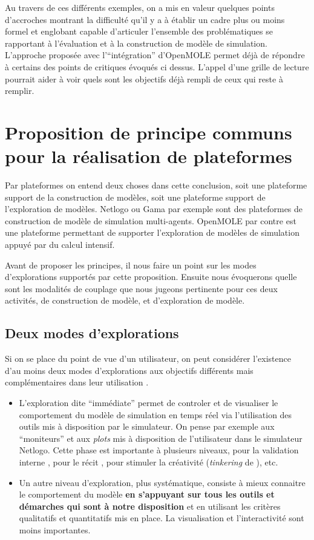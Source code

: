 Au travers de ces différents exemples, on a mis en valeur quelques points d'accroches montrant la difficulté qu'il y a à établir un cadre plus ou moins formel et englobant capable d'articuler l'ensemble des problématiques se rapportant à l'évaluation et à la construction de modèle de simulation. L'approche proposée avec l'\enquote{intégration}  d'OpenMOLE permet déjà de répondre à certains des points de critiques évoqués ci dessus. L'appel d'une grille de lecture pourrait aider à voir quels sont les objectifs déjà rempli de ceux qui reste à remplir.

\section{Proposition de principe communs pour la réalisation de plateformes}

Par plateformes on entend deux choses dans cette conclusion, soit une plateforme support de la construction de modèles, soit une plateforme support de l'exploration de modèles. Netlogo ou Gama par exemple sont des plateformes de construction de modèle de simulation multi-agents. OpenMOLE par contre est une plateforme permettant de supporter l'exploration de modèles de simulation appuyé par du calcul intensif.

Avant de proposer les principes, il nous faire un point sur les modes d'explorations supportés par cette proposition. Ensuite nous évoquerons quelle sont les modalités de couplage que nous jugeons pertinente pour ces deux activités, de construction de modèle, et d'exploration de modèle.

\subsection{Deux modes d'explorations}

Si on se place du point de vue d'un utilisateur, on peut considérer l'existence d'au moins deux modes d'explorations aux objectifs différents mais complémentaires dans leur utilisation \autocite[36]{Amblard2003}.

\begin{itemize}
 \item L'exploration dite \enquote{immédiate} permet de controler et de visualiser le comportement du modèle de simulation en temps réel via l'utilisation des outils mis à disposition par le simulateur. On pense par exemple aux \enquote{moniteurs} et aux \textit{plots}  mis à disposition de l'utilisateur dans le simulateur Netlogo. Cette phase est importante à plusieurs niveaux, pour la validation interne \autocite{Amblard2006} , pour le récit \autocites{Millington2012,OSullivan2004}, pour stimuler la créativité (\textit{tinkering} de \textcite{Resnick2013}), etc.  
 \item Un autre niveau d'exploration, plus systématique, consiste à mieux connaitre le comportement du modèle \textbf{en s'appuyant sur tous les outils et démarches qui sont à notre disposition} et en utilisant les critères qualitatifs et quantitatifs mis en place. La visualisation et l'interactivité sont moins importantes. 
\end{itemize}

